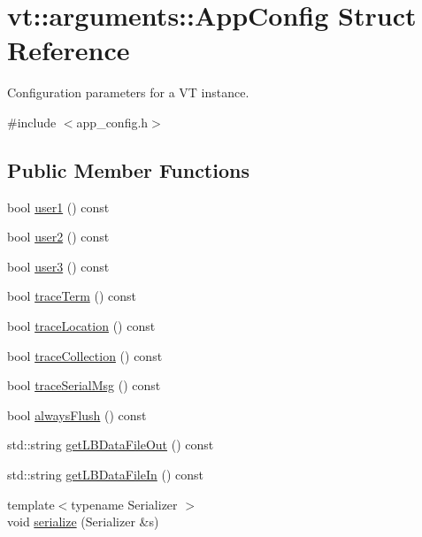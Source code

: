 \hypertarget{structvt_1_1arguments_1_1_app_config}{}\section{vt\+:\+:arguments\+:\+:App\+Config Struct Reference}
\label{structvt_1_1arguments_1_1_app_config}


Configuration parameters for a VT instance.  




{\ttfamily \#include $<$app\+\_\+config.\+h$>$}

\subsection*{Public Member Functions}
\begin{DoxyCompactItemize}
\item 
bool \hyperlink{structvt_1_1arguments_1_1_app_config_a2f94b5667c784de4398cb27110555e86}{user1} () const
\item 
bool \hyperlink{structvt_1_1arguments_1_1_app_config_ab504a2952d75b3f1fa9d81e8122cbc41}{user2} () const
\item 
bool \hyperlink{structvt_1_1arguments_1_1_app_config_ad11c798fedeafd2d5ec3f6737226afad}{user3} () const
\item 
bool \hyperlink{structvt_1_1arguments_1_1_app_config_afbe5bc2d7e470809bc204a30158ba96e}{trace\+Term} () const
\item 
bool \hyperlink{structvt_1_1arguments_1_1_app_config_a3a3b55a1c4f5a6b001e346d8b5ce084a}{trace\+Location} () const
\item 
bool \hyperlink{structvt_1_1arguments_1_1_app_config_adddc5276b065e2ea1c7a9b0626a8ce0d}{trace\+Collection} () const
\item 
bool \hyperlink{structvt_1_1arguments_1_1_app_config_a81f20c5bbc19af108fd9487e2a98b003}{trace\+Serial\+Msg} () const
\item 
bool \hyperlink{structvt_1_1arguments_1_1_app_config_adea8d58f81c4df7df475ac9f7780decc}{always\+Flush} () const
\item 
std\+::string \hyperlink{structvt_1_1arguments_1_1_app_config_a82e5247ad3ad6c2712dd31a2f5ff776f}{get\+L\+B\+Data\+File\+Out} () const
\item 
std\+::string \hyperlink{structvt_1_1arguments_1_1_app_config_aa0c962a874e2ab3a73db4fcd22b0c988}{get\+L\+B\+Data\+File\+In} () const
\item 
{\footnotesize template$<$typename Serializer $>$ }\\void \hyperlink{structvt_1_1arguments_1_1_app_config_af328ae786d91e9efb5f92d6a00b1cde1}{serialize} (Serializer \&s)
\end{DoxyCompactItemize}
